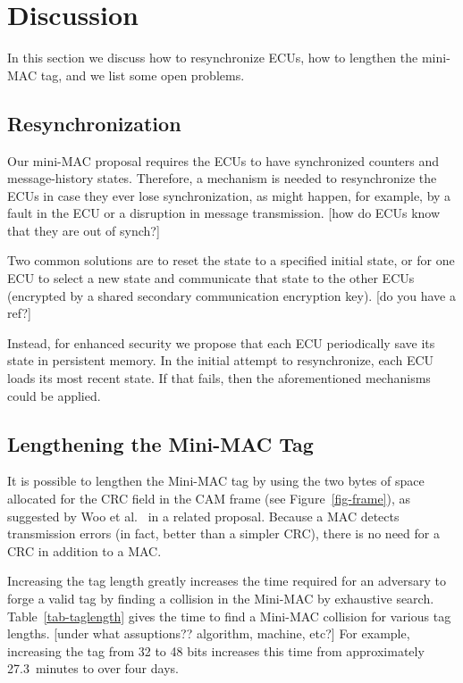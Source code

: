 \section{Discussion}
\label{discuss}

In this section we discuss how to resynchronize ECUs, 
how to lengthen the mini-MAC tag, 
and we list some open problems.


\subsection{Resynchronization}
\label{resynch}

Our mini-MAC proposal requires the ECUs to have synchronized counters and message-history states.
Therefore, a mechanism is needed to resynchronize the ECUs in case they ever lose synchronization,
as might happen, for example, by a fault in the ECU or a disruption in message transmission.
[how do ECUs know that they are out of synch?]

Two common solutions are to reset the state to a specified initial state, or for one ECU to select
a new state and communicate that state to the other ECUs (encrypted by a shared secondary communication
encryption key).  [do you have a ref?]

Instead, for enhanced security we propose that each ECU periodically save its state in persistent memory.  
In the initial attempt to resynchronize, each ECU loads its most recent state.  If that fails, then the aforementioned
mechanisms could be applied.


\subsection{Lengthening the Mini-MAC Tag}
\label{addingbits}

It is possible to lengthen the Mini-MAC tag by 
using the two bytes of space allocated for the CRC field in the CAM frame (see Figure~\ref{fig-frame}),
as suggested by Woo et al.~\cite{Woo-14} in a related proposal.
Because a MAC detects transmission errors (in fact, better than a simpler CRC), there is no need for
a CRC in addition to a MAC.  

Increasing the tag length greatly increases the time required for an adversary to forge a valid tag by
finding a collision in the Mini-MAC by exhaustive search.  Table~\ref{tab-taglength} gives the
time to find a Mini-MAC collision for various tag lengths. [under what assuptions?? algorithm, machine, etc?]
For example, increasing the tag from 32 to 48 bits increases this time from
approximately 27.3~minutes to over four days.

